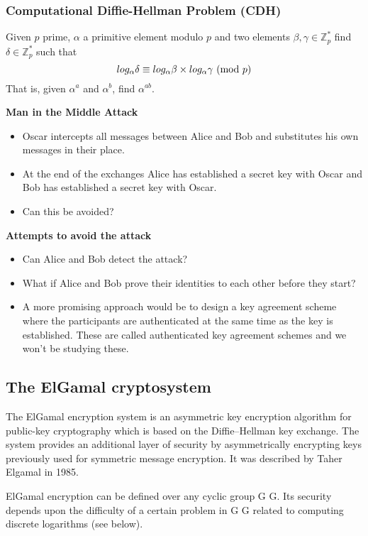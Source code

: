 \subsubsection{Computational Diffie-Hellman Problem (CDH)}
Given $p$ prime, $\alpha$ a primitive element modulo $p$
and two elements $\beta,\gamma \in \mathbb{Z}^*_p$
find $\delta \in \mathbb{Z}^*_p$ such that
$$log_\alpha\delta \equiv log_\alpha \beta \times log_\alpha \gamma \ (\mathrm{mod}\ p)$$
That is, given $\alpha^a$ and $\alpha^b$, find $\alpha^{ab}$.

\vspace{4mm}
\textbf{Man in the Middle Attack}
\begin{itemize}
    \item Oscar intercepts all messages between Alice and Bob and substitutes his own messages in their place.
    \item At the end of the exchanges Alice has established a secret key with Oscar and Bob has established a secret key with Oscar.
    \item Can this be avoided?
\end{itemize}
\textbf{Attempts to avoid the attack}
\begin{itemize}
    \item Can Alice and Bob detect the attack?
    \item What if Alice and Bob prove their identities to each other before they start?
    \item A more promising approach would be to design a key agreement scheme where the participants are authenticated at the same time as the key is established. These are called authenticated key agreement schemes and we won’t be studying these.
\end{itemize}

\pagebreak
\subsection{The ElGamal cryptosystem}
The ElGamal encryption system is an asymmetric key encryption algorithm for public-key cryptography which is based on the Diffie–Hellman key exchange. The system provides an additional layer of security by asymmetrically encrypting keys previously used for symmetric message encryption. It was described by Taher Elgamal in 1985.

ElGamal encryption can be defined over any cyclic group
G
G. Its security depends upon the difficulty of a certain problem in
G
G related to computing discrete logarithms (see below).


